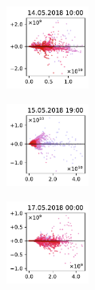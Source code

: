 \begin{figure}[H]
    \centering
    \begin{subfigure}
        \centering
        \includegraphics[width=0.30\textwidth,valign=t]{evaluation/figures/perturbations/perturbation-14.05.2018:10.00-nox-mul-1.01.pdf}
    \end{subfigure}
    \begin{subfigure}
        \centering
        \includegraphics[width=0.30\textwidth,valign=t]{evaluation/figures/perturbations/perturbation-15.05.2018:19.00-nox-mul-1.01.pdf}
    \end{subfigure}
    \begin{subfigure}
        \centering
        \includegraphics[width=0.30\textwidth,valign=t]{evaluation/figures/perturbations/perturbation-17.05.2018:00.00-nox-mul-1.01.pdf}
    \end{subfigure}


\end{figure}
